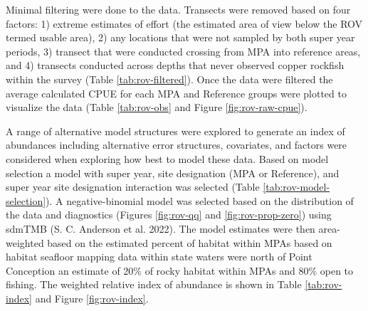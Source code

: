 \documentclass[11pt,
  english,
  letterpaper,
]{article}
\begin{document}
Minimal filtering were done to the data. Transects were removed based on four factors: 1) extreme estimates of effort (the estimated area of view below the ROV termed usable area), 2) any locations that were not sampled by both super year periods, 3) transect that were conducted crossing from MPA into reference areas, and 4) transects conducted across depths that never observed copper rockfish within the survey (Table \ref{tab:rov-filtered}). Once the data were filtered the average calculated CPUE for each MPA and Reference groups were plotted to visualize the data (Table \ref{tab:rov-obs} and Figure \ref{fig:rov-raw-cpue}).

A range of alternative model structures were explored to generate an index of abundances including alternative error structures, covariates, and factors were considered when exploring how best to model these data. Based on model selection a model with super year, site designation (MPA or Reference), and super year site designation interaction was selected (Table \ref{tab:rov-model-selection}). A negative-binomial model was selected based on the distribution of the data and diagnostics (Figures \ref{fig:rov-qq} and \ref{fig:rov-prop-zero}) using sdmTMB (S. C. Anderson et al. 2022). The model estimates were then area-weighted based on the estimated percent of habitat within MPAs based on habitat seafloor mapping data within state waters were north of Point Conception an estimate of 20\% of rocky habitat within MPAs and 80\% open to fishing. The weighted relative index of abundance is shown in Table \ref{tab:rov-index} and Figure \ref{fig:rov-index}.

\newpage



\newpage



\newpage

\begingroup\fontsize{7}{9}\selectfont
\end{document}
